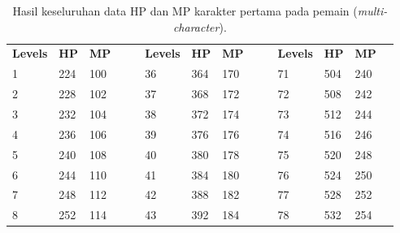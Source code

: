 \begin{table}[!h]
	\centering
	\caption{Hasil keseluruhan data HP dan MP karakter pertama pada pemain (\textit{multi-character}).}
	\vspace{-1ex}
	\label{tb:player_hp_mp_all_1}
	\begin{tabular}{|l|l|l|ll|l|l|l|llllll}
		\cline{1-3} \cline{6-8} \cline{11-13}
		\cellcolor[HTML]{C0C0C0}\textbf{Levels} & \cellcolor[HTML]{C0C0C0}\textbf{HP} & \cellcolor[HTML]{C0C0C0}\textbf{MP} &  &  & \cellcolor[HTML]{C0C0C0}\textbf{Levels} & \cellcolor[HTML]{C0C0C0}\textbf{HP} & \cellcolor[HTML]{C0C0C0}\textbf{MP} &  & \multicolumn{1}{l|}{} & \multicolumn{1}{l|}{\cellcolor[HTML]{C0C0C0}\textbf{Levels}} & \multicolumn{1}{l|}{\cellcolor[HTML]{C0C0C0}\textbf{HP}} & \multicolumn{1}{l|}{\cellcolor[HTML]{C0C0C0}\textbf{MP}} &  \\ \cline{1-3} \cline{6-8} \cline{11-13}
		1 & 224 & 100 &  &  & 36 & 364 & 170 &  & \multicolumn{1}{l|}{} & \multicolumn{1}{l|}{71} & \multicolumn{1}{l|}{504} & \multicolumn{1}{l|}{240} &  \\ \cline{1-3} \cline{6-8} \cline{11-13}
		2 & 228 & 102 &  &  & 37 & 368 & 172 &  & \multicolumn{1}{l|}{} & \multicolumn{1}{l|}{72} & \multicolumn{1}{l|}{508} & \multicolumn{1}{l|}{242} &  \\ \cline{1-3} \cline{6-8} \cline{11-13}
		3 & 232 & 104 &  &  & 38 & 372 & 174 &  & \multicolumn{1}{l|}{} & \multicolumn{1}{l|}{73} & \multicolumn{1}{l|}{512} & \multicolumn{1}{l|}{244} &  \\ \cline{1-3} \cline{6-8} \cline{11-13}
		4 & 236 & 106 &  &  & 39 & 376 & 176 &  & \multicolumn{1}{l|}{} & \multicolumn{1}{l|}{74} & \multicolumn{1}{l|}{516} & \multicolumn{1}{l|}{246} &  \\ \cline{1-3} \cline{6-8} \cline{11-13}
		5 & 240 & 108 &  &  & 40 & 380 & 178 &  & \multicolumn{1}{l|}{} & \multicolumn{1}{l|}{75} & \multicolumn{1}{l|}{520} & \multicolumn{1}{l|}{248} &  \\ \cline{1-3} \cline{6-8} \cline{11-13}
		6 & 244 & 110 &  &  & 41 & 384 & 180 &  & \multicolumn{1}{l|}{} & \multicolumn{1}{l|}{76} & \multicolumn{1}{l|}{524} & \multicolumn{1}{l|}{250} &  \\ \cline{1-3} \cline{6-8} \cline{11-13}
		7 & 248 & 112 &  &  & 42 & 388 & 182 &  & \multicolumn{1}{l|}{} & \multicolumn{1}{l|}{77} & \multicolumn{1}{l|}{528} & \multicolumn{1}{l|}{252} &  \\ \cline{1-3} \cline{6-8} \cline{11-13}
		8 & 252 & 114 &  &  & 43 & 392 & 184 &  & \multicolumn{1}{l|}{} & \multicolumn{1}{l|}{78} & \multicolumn{1}{l|}{532} & \multicolumn{1}{l|}{254} &  \\ \cline{1-3} \cline{6-8} \cline{11-13}

\end{tabular}
\end{table}
